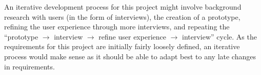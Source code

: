 An iterative development process for this project might involve background
research with users (in the form of interviews), the creation of a prototype,
refining the user experience through more interviews, and repeating the
``prototype $\rightarrow$ interview $\rightarrow$ refine user experience
$\rightarrow$ interview'' cycle. As the requirements for this project are
initially fairly loosely defined, an iterative process would make sense as it
should be able to adapt best to any late changes in requirements.
